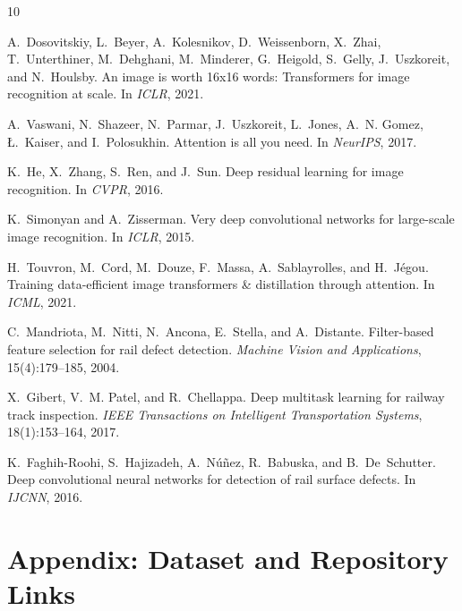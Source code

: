 \documentclass[10pt,twocolumn,letterpaper]{article}
\begin{document}
{\small

\begin{thebibliography}{10}

A.~Dosovitskiy, L.~Beyer, A.~Kolesnikov, D.~Weissenborn, X.~Zhai,
  T.~Unterthiner, M.~Dehghani, M.~Minderer, G.~Heigold, S.~Gelly, J.~Uszkoreit,
  and N.~Houlsby.
\newblock An image is worth 16x16 words: Transformers for image recognition at
  scale.
\newblock In \emph{ICLR}, 2021.

A.~Vaswani, N.~Shazeer, N.~Parmar, J.~Uszkoreit, L.~Jones, A.~N. Gomez,
  {\L}.~Kaiser, and I.~Polosukhin.
\newblock Attention is all you need.
\newblock In \emph{NeurIPS}, 2017.

K.~He, X.~Zhang, S.~Ren, and J.~Sun.
\newblock Deep residual learning for image recognition.
\newblock In \emph{CVPR}, 2016.

K.~Simonyan and A.~Zisserman.
\newblock Very deep convolutional networks for large-scale image recognition.
\newblock In \emph{ICLR}, 2015.

H.~Touvron, M.~Cord, M.~Douze, F.~Massa, A.~Sablayrolles, and H.~J\'{e}gou.
\newblock Training data-efficient image transformers \& distillation through
  attention.
\newblock In \emph{ICML}, 2021.

C.~Mandriota, M.~Nitti, N.~Ancona, E.~Stella, and A.~Distante.
\newblock Filter-based feature selection for rail defect detection.
\newblock \emph{Machine Vision and Applications}, 15(4):179--185, 2004.

X.~Gibert, V.~M. Patel, and R.~Chellappa.
\newblock Deep multitask learning for railway track inspection.
\newblock \emph{IEEE Transactions on Intelligent Transportation Systems},
  18(1):153--164, 2017.

K.~Faghih-Roohi, S.~Hajizadeh, A.~N\'{u}\~{n}ez, R.~Babuska, and B.~De~Schutter.
\newblock Deep convolutional neural networks for detection of rail surface
  defects.
\newblock In \emph{IJCNN}, 2016.

\end{thebibliography}
}

\clearpage
\appendix

\section*{Appendix: Dataset and Repository Links}
\end{document}
